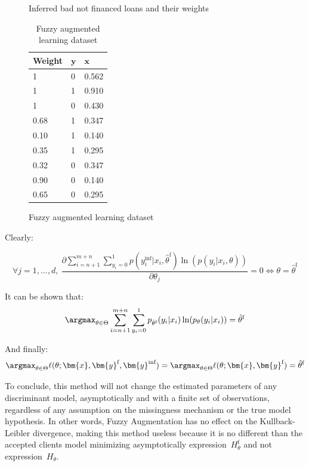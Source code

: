 \begin{table}
{\begin{multicols}{4}
\begin{subfigure}[t]{0.22\textwidth}
\caption{Inferred bad not financed loans and their weights}
\label{fuzzy:sfig3}
\end{subfigure}

\columnbreak

\begin{subfigure}[t]{0.22\textwidth}
\begin{center}
\begin{adjustbox}{max width=0.95\textwidth}
\begin{tabular}{l l l}
\toprule
\textbf{Weight} & \textbf{${\bm{y}}$} & \textbf{${\bm{x}}$}\\
\midrule
1 & 0 & 0.562 \\
1 & 1 & 0.910 \\
1 & 0 & 0.430 \\
0.68 & 1 & 0.347 \\
0.10 & 1 & 0.140 \\
0.35 & 1 & 0.295 \\
0.32 & 0 & 0.347 \\
0.90 & 0 & 0.140 \\
0.65 & 0 & 0.295 \\
\bottomrule
\end{tabular}
\end{adjustbox}
\end{center}
\caption{Fuzzy augmented learning dataset}
\label{fuzzy:sfig4}
\end{subfigure}

\end{multicols}
}
\end{table}

 Clearly:

 \[ \forall j = 1, \ldots, d, \: \frac{\partial \sum_{i=n+1}^{m+n} \sum_{y_i = 0}^{1} p(y_i^{\text{inf}}| x_i, \hat{\theta}^{\text{f}})\ln (p(y_i| x_i, \theta))}{\partial \theta_j} = 0 \Leftrightarrow \theta = \hat{\theta}^{\text{f}} \]

 It can be shown that:
 \[\argmax_{\theta \in \Theta}  \sum_{i=n+1}^{m+n} \sum_{y_i = 0}^{1} p_{\hat{\theta}^{\text{f}}}(y_i| x_i)\ln (p_\theta(y_i| x_i)) = \hat{\theta}^{\text{f}}\]

 And finally:
 \[\argmax_{\theta \in \Theta} \ell(\theta;{\bm{x}},{\bm{y}}^{\text{f}},{\bm{y}}^{\text{inf}}) = \argmax_{\theta \in \Theta} \ell(\theta;{\bm{x}},{\bm{y}}^{\text{f}}) = \hat{\theta}^{\text{f}}\]

 To conclude, this method will not change the estimated parameters of any discriminant model, asymptotically and with a finite set of observations, regardless of any assumption on the missingness mechanism or the true model hypothesis. In other words, Fuzzy Augmentation has no effect on the Kullback-Leibler divergence, making this method useless because it is no different than the accepted clients model minimizing asymptotically expression~$H^{\text{f}}_{\theta}$ and not expression~$H_{\theta}$.


